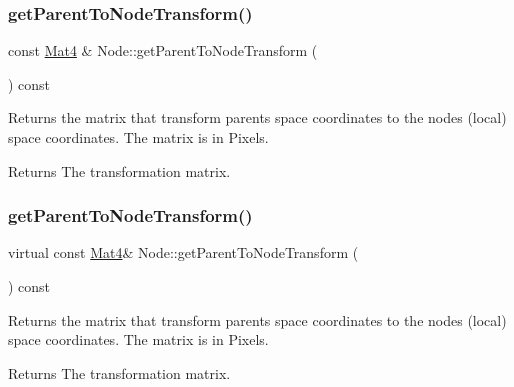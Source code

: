 \subsubsection{\texorpdfstring{get\+Parent\+To\+Node\+Transform()}{getParentToNodeTransform()}\hspace{0.1cm}{\footnotesize\ttfamily [1/2]}}
{\footnotesize\ttfamily const \hyperlink{classMat4}{Mat4} \& Node\+::get\+Parent\+To\+Node\+Transform (\begin{DoxyParamCaption}{ }\end{DoxyParamCaption}) const\hspace{0.3cm}{\ttfamily [virtual]}}

Returns the matrix that transform parent\textquotesingle{}s space coordinates to the node\textquotesingle{}s (local) space coordinates. The matrix is in Pixels.

\begin{DoxyReturn}{Returns}
The transformation matrix. 
\end{DoxyReturn}
\mbox{\label{classNode_a079a813e52c5b8a2d4f0c4bd5fa90a91}} 
\subsubsection{\texorpdfstring{get\+Parent\+To\+Node\+Transform()}{getParentToNodeTransform()}\hspace{0.1cm}{\footnotesize\ttfamily [2/2]}}
{\footnotesize\ttfamily virtual const \hyperlink{classMat4}{Mat4}\& Node\+::get\+Parent\+To\+Node\+Transform (\begin{DoxyParamCaption}{ }\end{DoxyParamCaption}) const\hspace{0.3cm}{\ttfamily [virtual]}}

Returns the matrix that transform parent\textquotesingle{}s space coordinates to the node\textquotesingle{}s (local) space coordinates. The matrix is in Pixels.

\begin{DoxyReturn}{Returns}
The transformation matrix. 
\end{DoxyReturn}
\mbox{\label{classNode_a1c78c6feace91b27b6cbb12ee16e8eb0}} 
